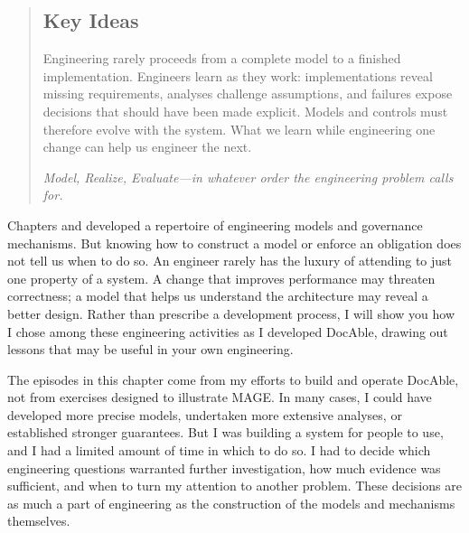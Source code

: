 



\begin{quote}
\mbox{}%
\subsection{Key Ideas}\label{heading:the-mage-cycle}

Engineering rarely proceeds from a complete model to a finished implementation. Engineers learn as they work: implementations reveal missing requirements, analyses challenge assumptions, and failures expose decisions that should have been made explicit. Models and controls must therefore evolve with the system. What we learn while engineering one change can help us engineer the next.

\emph{Model, Realize, Evaluate---in whatever order the engineering problem calls for.}
\end{quote}

Chapters  and  developed a repertoire of engineering models and governance mechanisms. But knowing how to construct a model or enforce an obligation does not tell us when to do so. An engineer rarely has the luxury of attending to just one property of a system. A change that improves performance may threaten correctness; a model that helps us understand the architecture may reveal a better design. Rather than prescribe a development process, I will show you how I chose among these engineering activities as I developed DocAble, drawing out lessons that may be useful in your own engineering.

The episodes in this chapter come from my efforts to build and operate DocAble, not from exercises designed to illustrate MAGE. In many cases, I could have developed more precise models, undertaken more extensive analyses, or established stronger guarantees. But I was building a system for people to use, and I had a limited amount of time in which to do so. I had to decide which engineering questions warranted further investigation, how much evidence was sufficient, and when to turn my attention to another problem. These decisions are as much a part of engineering as the construction of the models and mechanisms themselves.

